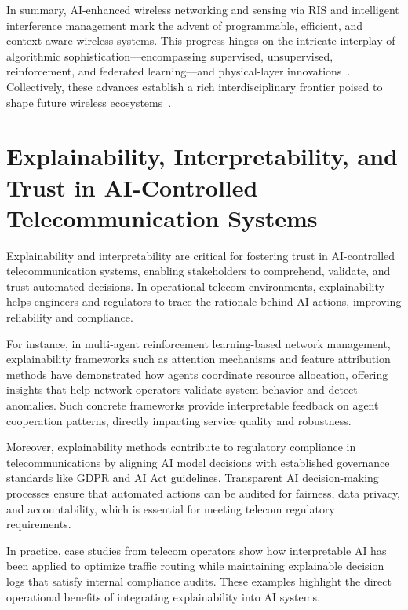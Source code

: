 \documentclass[sigconf]{acmart}
\begin{document}
\bigskip

In summary, AI-enhanced wireless networking and sensing via RIS and intelligent interference management mark the advent of programmable, efficient, and context-aware wireless systems. This progress hinges on the intricate interplay of algorithmic sophistication—encompassing supervised, unsupervised, reinforcement, and federated learning—and physical-layer innovations~\cite{ref49}. Collectively, these advances establish a rich interdisciplinary frontier poised to shape future wireless ecosystems~\cite{ref41,ref42,ref43,ref44,ref45,ref48,ref49}.

\section{Explainability, Interpretability, and Trust in AI-Controlled Telecommunication Systems}

Explainability and interpretability are critical for fostering trust in AI-controlled telecommunication systems, enabling stakeholders to comprehend, validate, and trust automated decisions. In operational telecom environments, explainability helps engineers and regulators to trace the rationale behind AI actions, improving reliability and compliance.

For instance, in multi-agent reinforcement learning-based network management, explainability frameworks such as attention mechanisms and feature attribution methods have demonstrated how agents coordinate resource allocation, offering insights that help network operators validate system behavior and detect anomalies. Such concrete frameworks provide interpretable feedback on agent cooperation patterns, directly impacting service quality and robustness.

Moreover, explainability methods contribute to regulatory compliance in telecommunications by aligning AI model decisions with established governance standards like GDPR and AI Act guidelines. Transparent AI decision-making processes ensure that automated actions can be audited for fairness, data privacy, and accountability, which is essential for meeting telecom regulatory requirements.

In practice, case studies from telecom operators show how interpretable AI has been applied to optimize traffic routing while maintaining explainable decision logs that satisfy internal compliance audits. These examples highlight the direct operational benefits of integrating explainability into AI systems.
\end{document}
